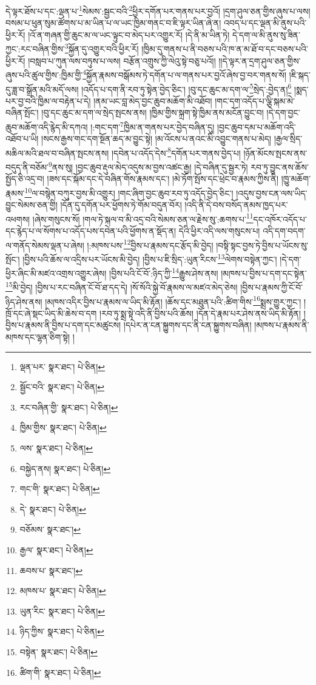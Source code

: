 དེ་ལྟར་ཐོས་པ་དང་:ལྡན་པ་\footnote{ལྡན་པར་  སྣར་ཐང་།  པེ་ཅིན། }སེམས་:སྦྱང་བའི་\footnote{སྦྱོང་བའི་  སྣར་ཐང་།  པེ་ཅིན། }ཕྱིར་དགོན་པར་གནས་པར་བྱའོ། །དྲག་ཤུལ་ཅན་གྱིས་ཞུས་པ་ལས། བསམ་པ་ཕུན་སུམ་ཚོགས་པ་མ་ཡིན་པ་ལ་ཡང་ཁྱིམ་གནང་བ་ཇི་ལྟར་ཡིན་ཞེ་ན། འབད་པ་དང་ལྡན་མི་ནུས་པའི་ཕྱིར་རོ། །འོ་ན་གཞན་གྱི་ཆུང་མ་ལ་ཡང་ལྟུང་བ་མེད་པར་འགྱུར་རོ། །དེ་ནི་མ་ཡིན་ཏེ། དེ་དག་ལ་མི་ནུས་སུ་ཟིན་ཀྱང་:རང་བཞིན་གྱིས་\footnote{རང་བཞིན་གྱི་  སྣར་ཐང་།  པེ་ཅིན། }སྐྱོན་དུ་འགྱུར་བའི་ཕྱིར་རོ། །ཁྱིམ་དུ་གནས་པ་ནི་བཅས་པའི་ཁ་ན་མ་ཐོ་བ་དང་བཅས་པའི་ཕྱིར་རོ། །བསླབ་པ་ཀུན་ལས་བཏུས་པ་ལས། བརྩོན་འགྲུས་ཀྱི་ལེའུ་སྟེ་བཅུ་པའོ།། །།དེ་ལྟར་ན་དྲག་ཤུལ་ཅན་གྱིས་ཞུས་པའི་ཚུལ་གྱིས་:ཁྱིམ་གྱི་\footnote{ཁྱིམ་གྱིས་  སྣར་ཐང་།  པེ་ཅིན། }སྐྱོན་རྣམས་བསྒོམས་ཏེ་དགོན་པ་ལ་གནས་པར་བྱའོ་ཞེས་བྱ་བར་གནས་སོ། །ཇི་སྐད་དུ་ཟླ་བ་སྒྲོན་མའི་མདོ་ལས། །འདོད་པ་དག་ནི་རབ་ཏུ་སྟེན་བྱེད་ཅིང་། །བུ་དང་ཆུང་མ་དག་ལ་\footnote{ལས་  སྣར་ཐང་།  པེ་ཅིན། }སྲེད་:བྱེད་ན།\footnote{བསྐྱེད་ནས།  སྣར་ཐང་།  པེ་ཅིན། } །སྨད་པར་བྱ་བའི་ཁྱིམ་ལ་བརྟེན་པ་དེ། །ནམ་ཡང་བླ་མེད་བྱང་ཆུབ་མཆོག་མི་འཐོབ། །གང་དག་འདོད་པ་ལྕི་སྐམ་མེ་བཞིན་སྤོང་། །བུ་དང་ཆུང་མ་དག་ལ་སྲེད་སྤངས་ནས། །ཁྱིམ་གྱིས་སྐྲག་སྟེ་ཁྱིམ་ནས་མངོན་བྱུང་བ། །དེ་དག་བྱང་ཆུབ་མཆོག་འདི་རྙེད་མི་དཀའ། །:གང་དག་\footnote{གང་གི་  སྣར་ཐང་།  པེ་ཅིན། }ཁྱིམ་ན་གནས་པར་བྱེད་བཞིན་དུ། །བྱང་ཆུབ་དམ་པ་མཆོག་འདི་འཐོབ་པ་ཡི། །སངས་རྒྱས་གང་དག་སྔོན་ཆད་མ་བྱུང་སྟེ། །མ་འོངས་པ་ནའང་མི་འབྱུང་གནས་པ་མེད། །རྒྱལ་སྲིད་མཆིལ་མའི་ཐལ་བ་བཞིན་སྤངས་ནས། །དབེན་པ་འདོད་དེས་\footnote{དེ་  སྣར་ཐང་།  པེ་ཅིན། }དགོན་པར་གནས་བྱེད་པ། །ཉོན་མོངས་སྤངས་ནས་བདུད་ནི་བཅོམ་\footnote{བཅོམས་  སྣར་ཐང་། }ནས་སུ། །བྱང་ཆུབ་རྡུལ་མེད་འདུས་མ་བྱས་འཚང་རྒྱ། །དེ་བཞིན་དུ་སྦྱར་ཏེ། རབ་ཏུ་བྱུང་ནས་ཆོས་སྤྱོད་ཅི་འདྲ་བ། །ཟས་དང་སྐོམ་དང་དེ་བཞིན་གོས་རྣམས་དང་། །མེ་ཏོག་སྤོས་དང་ཕྲེང་བ་རྣམས་ཀྱིས་ནི། །ཁྱུ་མཆོག་རྣམས་\footnote{རྒྱལ་  སྣར་ཐང་།  པེ་ཅིན། }ལ་བསྙེན་བཀུར་བྱས་མི་འགྱུར། །གང་ཞིག་བྱང་ཆུབ་རབ་ཏུ་འདོད་བྱེད་ཅིང་། །འདུས་བྱས་ངན་ལས་ཡིད་བྱུང་སེམས་ཅན་གྱི། །དོན་དུ་དགོན་པར་ཕྱོགས་ཏེ་གོམ་བདུན་བོར། །འདི་ནི་དེ་བས་བསོད་ནམས་ཁྱད་པར་འཕགས། །ཞེས་གསུངས་སོ། །གལ་ཏེ་སྐལ་བ་མི་འདྲ་བའི་སེམས་ཅན་ལ་རྗེས་སུ་:ཆགས་པ་\footnote{ཆབས་པ་  སྣར་ཐང་། }དང་འཁོར་འདོད་པ་དང་རྙེད་པ་ལ་སོགས་པ་འདོད་པས་དབེན་པའི་ཕྱོགས་ན་སྡོད་ན། དེའི་ཕྱིར་འདི་ལས་གསུངས་པ། འདི་དག་བདག་ལ་གནོད་སེམས་ལྡན་པ་ཞེས། །:མཁས་པས་\footnote{མཁས་པ་  སྣར་ཐང་།  པེ་ཅིན། }བྱིས་པ་རྣམས་དང་རྩོད་མི་བྱེད། །བསྟི་སྟང་བྱས་ཏེ་བྱིས་པ་ཡོངས་སུ་སྤོང་། །བྱིས་པའི་ཆོས་ལ་འདྲིས་པར་ཡོངས་མི་བྱེད། །བྱིས་པ་ཇི་སྲིད་:ཡུན་རིངས་\footnote{ཡུན་རིང་  སྣར་ཐང་།  པེ་ཅིན། }ལེགས་བསྟེན་ཀྱང་། །དེ་དག་ཕྱིར་ཞིང་མི་མཛའ་འགྲས་འགྱུར་ཞེས། །བྱིས་པའི་ངོ་བོ་:ཉིད་ཀྱི་\footnote{ཉིད་ཀྱིས་  སྣར་ཐང་།  པེ་ཅིན། }རྒྱུས་ཤེས་ནས། །མཁས་པ་བྱིས་པ་དག་དང་སྟེན་\footnote{བསྟེན་  སྣར་ཐང་།  པེ་ཅིན། }མི་བྱེད། །བྱིས་པ་རང་བཞིན་ངོ་བོ་ཐ་དད་དེ། །སོ་སོའི་སྐྱེ་བོ་རྣམས་ལ་མཛའ་མེད་ཅེས། །བྱིས་པ་རྣམས་ཀྱི་ངོ་བོ་ཉིད་ཤེས་ནས། །མཁས་འདིར་བྱིས་པ་རྣམས་ལ་ཡིད་མི་རྟོན། །ཆོས་དང་མཐུན་པའི་:ཚིག་གིས་\footnote{ཚིག་གི་  སྣར་ཐང་།  པེ་ཅིན། }སྨྲས་གྱུར་ཀྱང་། །ཁྲོ་དང་ཞེ་སྡང་ཡིད་མི་ཆེས་བ་དག །རབ་ཏུ་སྨྲ་སྟེ་འདི་ནི་བྱིས་པའི་ཆོས། །དོན་དེ་རྣམ་པར་ཤེས་ནས་ཡིད་མི་རྟོན། །བྱིས་པ་རྣམས་ནི་བྱིས་པ་དག་དང་མཚུངས། །དཔེར་ན་ངན་སྐྱུགས་དང་ནི་ངན་སྐྱུགས་བཞིན། །མཁས་པ་རྣམས་ནི་མཁས་དང་ལྷན་ཅིག་སྟེ། །
